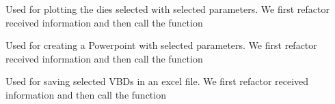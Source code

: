 \documentclass[letterpaper,10pt,english]{sphinxmanual}
\begin{document}

\begin{fulllineitems}
\label{\detokenize{app:app.plot_we_want}}
\pysigstartsignatures
{}
\pysigstopsignatures
\sphinxAtStartPar
Used for plotting the dies selected with selected parameters. We first refactor received information and then call the function

\end{fulllineitems}


\begin{fulllineitems}
\label{\detokenize{app:app.ppt_structure_route}}
\pysigstartsignatures
{}
\pysigstopsignatures
\sphinxAtStartPar
Used for creating a Powerpoint with selected parameters. We first refactor received information and then call the function

\end{fulllineitems}


\begin{fulllineitems}
\label{\detokenize{app:app.reg_excel_VBD}}
\pysigstartsignatures
{}
\pysigstopsignatures
\sphinxAtStartPar
Used for saving selected VBDs in an excel file.
We first refactor received information and then call the function

\end{fulllineitems}
\end{document}
